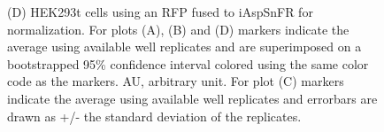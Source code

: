 \documentclass[9pt,lineno]{elife}
\begin{document}
\begin{figure}[ht!]
{(D) HEK293t cells using an RFP fused to iAspSnFR for normalization.
For plots (A), (B) and (D) markers indicate the average using available well replicates and are superimposed on a bootstrapped 95\% confidence interval colored using the same color code as the markers.
AU, arbitrary unit.
For plot (C) markers indicate the average using available well replicates and errorbars are drawn as +/- the standard deviation of the replicates.
}{}\label{figsupp:f2S1}
\label{figsupp:f2S2}
\end{figure}
\end{document}
